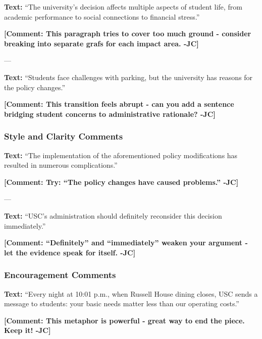 \documentclass[12pt]{article}
\begin{document}
\begin{examplebox}
\textbf{Text:} ``The university's decision affects multiple aspects of student life, from academic performance to social connections to financial stress.''

\textbf{\textcolor{atlantic}{[Comment: This paragraph tries to cover too much ground - consider breaking into separate grafs for each impact area. -JC]}}
\end{examplebox}

---

\begin{examplebox}
\textbf{Text:} ``Students face challenges with parking, but the university has reasons for the policy changes.''

\textbf{\textcolor{atlantic}{[Comment: This transition feels abrupt - can you add a sentence bridging student concerns to administrative rationale? -JC]}}
\end{examplebox}

\subsubsection{Style and Clarity Comments}

\begin{examplebox}
\textbf{Text:} ``The implementation of the aforementioned policy modifications has resulted in numerous complications.''

\textbf{\textcolor{atlantic}{[Comment: Try: ``The policy changes have caused problems.'' -JC]}}
\end{examplebox}

---

\begin{examplebox}
\textbf{Text:} ``USC's administration should definitely reconsider this decision immediately.''

\textbf{\textcolor{atlantic}{[Comment: ``Definitely'' and ``immediately'' weaken your argument - let the evidence speak for itself. -JC]}}
\end{examplebox}
\newpage
\subsubsection{Encouragement Comments}

\begin{examplebox}
\textbf{Text:} ``Every night at 10:01 p.m., when Russell House dining closes, USC sends a message to students: your basic needs matter less than our operating costs.''

\textbf{\textcolor{atlantic}{[Comment: This metaphor is powerful - great way to end the piece. Keep it! -JC]}}
\end{examplebox}
\end{document}
